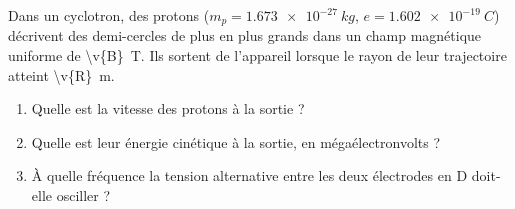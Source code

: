 Dans un cyclotron, des protons ($m_p = \qty{1.673e-27}{kg}$, $e = \qty{1.602e-19}{C}$) décrivent des demi-cercles de plus en plus grands dans un champ magnétique uniforme de \qty{\v{B}}{T}. Ils sortent de l'appareil lorsque le rayon de leur trajectoire atteint \qty{\v{R}}{m}.

\begin{enumerate}[label=\alph*)]
    \item Quelle est la vitesse des protons à la sortie ?
    \item Quelle est leur énergie cinétique à la sortie, en mégaélectronvolts ?
    \item À quelle fréquence la tension alternative entre les deux électrodes en D doit-elle osciller ?
\end{enumerate}
